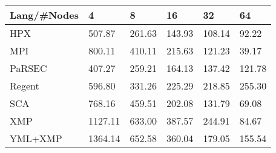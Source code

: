 \begin{tabularx}{\textwidth}{CCCCCC}
Lang/#Nodes& 4 & 8 & 16 & 32 & 64 \\ \hline
HPX & 507.87 & 261.63 & 143.93 & 108.14 & 92.22 \\
MPI & 800.11 & 410.11 & 215.63 & 121.23 & 39.17 \\
PaRSEC & 407.27 & 259.21 & 164.13 & 137.42 & 121.78 \\
Regent & 596.80 & 331.26 & 225.29 & 218.85 & 255.30 \\
SCA & 768.16 & 459.51 & 202.08 & 131.79 & 69.08 \\
XMP & 1127.11 & 633.00 & 387.57 & 244.91 & 84.67 \\
YML+XMP & 1364.14 & 652.58 & 360.04 & 179.05 & 155.54 \\
\hline
\end{tabularx}
